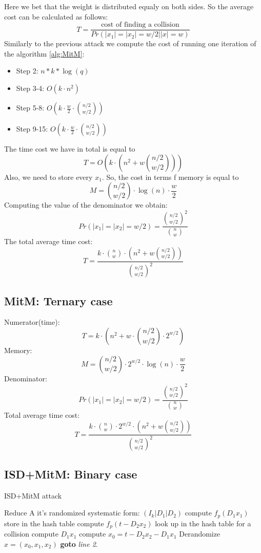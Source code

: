 \documentclass[12pt]{article}
\begin{document}
Here we bet that the weight is distributed equaly on both sides. So the average cost can be calculated as follows:
\[
  T = \frac{\text{cost of finding a collision}}{Pr(|x_1| = |x_2| = w/2| |x| =w)}
\]
Similarly to the previous attack we compute the cost of running one iteration of the algorithm \ref{alg:MitM}:
\begin{itemize}
    \item Step 2: $n*k*\log(q)$
    \item Step 3-4: $O(k \cdot n^2)$
    \item Step 5-8: $O(k \cdot \frac{w}{2} \cdot \binom{n/2}{w/2})$
    \item Step 9-15: $O(k \cdot \frac{w}{2} \cdot \binom{n/2}{w/2})$
\end{itemize}

The time cost we have in total is equal to
\[
T = O(k \cdot (n^2 + w\binom{n/2}{w/2}))
\]
Also, we need to store every $x_1$. So, the cost in terms f memory is equal to
\[
M = \binom{n/2}{w/2} \cdot \log(n) \cdot \frac{w}{2}
\]
Computing the value of the denominator we obtain:
\[
Pr(|x_1| = |x_2| = w/2) = \frac{\binom{n/2}{w/2}^{2}}{\binom{n}{w}}
\]
The total average time cost:
\[
  T = \frac{k \cdot \binom{n}{w} \cdot (n^2 + w\binom{n/2}{w/2})}{\binom{n/2}{w/2}^2}
\]

\subsection{MitM: Ternary case}
Numerator(time):
\[
T = k \cdot (n^2 + w \cdot \binom{n/2}{w/2} \cdot 2^{w/2})
\]
Memory:
\[
M = \binom{n/2}{w/2} \cdot 2^{w/2} \cdot \log(n) \cdot \frac{w}{2}
\]
Denominator:
\[
Pr(|x_1| = |x_2| = w/2) = \frac{\binom{n/2}{w/2}^{2}}{\binom{n}{w}}
\]
Total average time cost:
\[
  T = \frac{k \cdot \binom{n}{w} \cdot 2^{w/2} \cdot (n^2 + w\binom{n/2}{w/2})}{\binom{n/2}{w/2}^2}
\]

\subsection{ISD+MitM: Binary case}

\begin{algorithm}
\caption{ISD+MitM attack}\label{alg:ISD+MitM}
\begin{algorithmic}[1]
    \State Reduce A it's randomized systematic form: $(I_k |D_1|D_2)$
    \State compute $f_{p}(D_1x_1)$
    \State store in the hash table
    \EndFor
    \State compute $f_{p}(t - D_2x_2)$
    \State look up in the hash table for a collision
        \State compute $D_1x_1$
        \State compute $x_0 = t - D_2x_2 - D_1x_1$
        \State \Return Derandomize $x = (x_0, x_1, x_2)$
        \EndIf
    \EndIf
    \EndFor
\State \textbf{goto} \emph{line 2}.
\EndProcedure
\end{algorithmic}
\end{algorithm}
\end{document}
